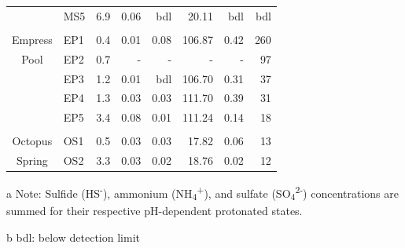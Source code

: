 {\begin{table}[htbp]
\begin{adjustbox}{width=\textwidth,keepaspectratio}
\begin{threeparttable}
\begin{tabular}{clrrrrrr}
      & MS5   & 6.9   & 0.06  & bdl   & 20.11 & bdl   & bdl \\
      &       &       &       &       &       &       &  \\
Empress & EP1   & 0.4   & 0.01  & 0.08  & 106.87 & 0.42  & 260 \\
Pool  & EP2   & 0.7   & -     & -     & -     & -     & 97 \\
      & EP3   & 1.2   & 0.01  & bdl   & 106.70 & 0.31  & 37 \\
      & EP4   & 1.3   & 0.03  & 0.03  & 111.70 & 0.39  & 31 \\
      & EP5   & 3.4   & 0.08  & 0.01  & 111.24 & 0.14  & 18 \\
      &       &       &       &       &       &       &  \\
Octopus & OS1   & 0.5   & 0.03  & 0.03  & 17.82 & 0.06  & 13 \\
Spring & OS2   & 3.3   & 0.03  & 0.02  & 18.76 & 0.02  & 12 \\
\bottomrule
\end{tabular}%


	\begin{tablenotes}
      \small
      \item[a] Note: Sulfide (HS\textsuperscript{-}), ammonium (NH\textsubscript{4}\textsuperscript{+}), and sulfate (SO\textsubscript{4}\textsuperscript{2-}) concentrations are summed for their respective pH-dependent protonated states.
      
      \item[b] bdl: below detection limit
      \normalsize
    \end{tablenotes}
  \label{tab:redox}%
  \end{threeparttable}
  \end{adjustbox}
\end{table}%
\doublespace
\clearpage
}

